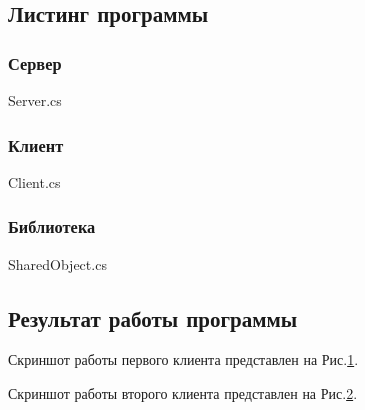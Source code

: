\documentclass[russian,utf8,pointsection]{eskdtext}
\begin{document}
       	\subsection{Листинг программы}
       	\subsubsection{Сервер}
       	
       	{Server.cs}  
       	
      
     \subsubsection{Клиент}
    
    {Client.cs}  
    
       
        \subsubsection{Библиотека}
        
        {SharedObject.cs}  
       	
       	\subsection{Результат работы программы}
       	Скриншот работы первого клиента представлен на Рис.\ref{ris:1-2}.
       	\begin{figure}[!h]
       		\caption{}
       		\label{ris:1-2}
       	\end{figure}
       	\newpage
       	Скриншот работы второго клиента представлен на Рис.\ref{ris:1-3}.
       	\begin{figure}[!h]
       		\caption{}
       		\label{ris:1-3}
       	\end{figure}
       	
\end{document}
